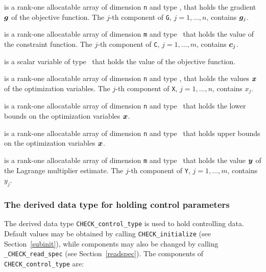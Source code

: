 \documentclass{galahad}
\newcommand{\packagename}{CHECK}
\newcommand{\fullpackagename}{\libraryname\_\packagename}
\begin{document}
\begin{description}
 is a rank-one allocatable array of dimension {\tt n} and type 
\realdp, that holds the gradient ${\bm{g}}$ 
of the objective function.
The $j$-th component of 
{\tt G}, $j = 1,  \ldots ,  n$, contains ${\bm{g}}_{j}$.

 is a rank-one allocatable array of dimension {\tt m} and type 
\realdp\ that holds the value of the constraint function.
The $j$-th component of {\tt C}, $j = 1, \ldots , m$, contains ${\bm{c}}_{j}$.

 is a scalar variable of type 
\realdp\ that holds the value of the objective function.

 is a rank-one allocatable array of dimension {\tt n} and type 
\realdp, 
that holds the values ${\bm{x}}$ of the optimization variables.
The $j$-th component of {\tt X}, $j = 1,  \ldots , n$, contains
$x_{j}$.

 is a rank-one allocatable array of dimension {\tt n} and type 
\realdp\ 
that holds the lower bounds on the optimization variables ${\bm{x}}$.

 is a rank-one allocatable array of dimension {\tt n} and type 
\realdp\ 
that holds upper  bounds on the optimization variables ${\bm{x}}$.

 is a rank-one allocatable array of dimension {\tt m} and type 
\realdp\ 
that holds the value ${\bm{y}}$ of the Lagrange multiplier estimate.
The $j$-th component of {\tt Y}, $j = 1,  \ldots , m$, contains
$y_{j}$.  

\end{description}


\subsubsection{The derived data type for holding control 
 parameters}\label{typecontrol}
The derived data type 
{\tt \packagename\_control\_type} 
is used to hold controlling data. Default values may be obtained by calling 
{\tt \packagename\_initialize}
(see Section~\ref{subinit}),
while components may also be changed by calling 
{\tt \fullpackagename\_read\-\_spec}
(see Section~\ref{readspec}). 
The components of 
{\tt \packagename\_control\_type} 
are:
\end{document}

